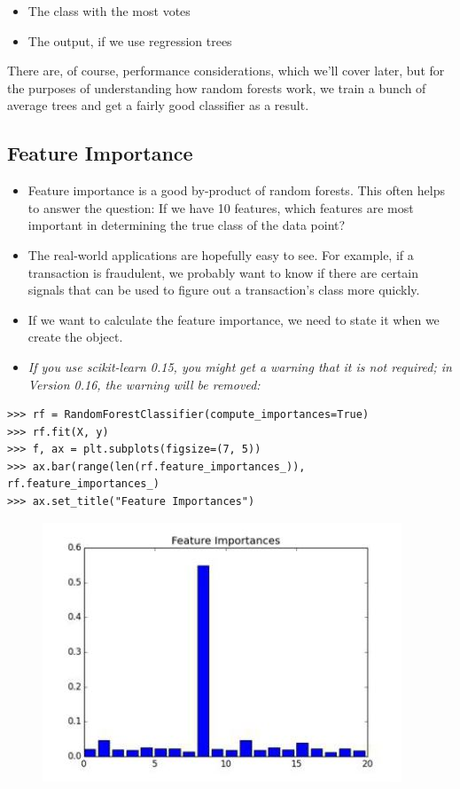 \documentclass[SKL-MASTER.tex]{subfiles}
\begin{document}
\begin{itemize}
\item  The class with the most votes
\item  The output, if we use regression trees
\end{itemize}
There are, of course, performance considerations, which we'll cover later, but for
the purposes of understanding how random forests work, we train a bunch of average trees
and get a fairly good classifier as a result.
\newpage
\subsection*{Feature Importance}
\begin{itemize}
\item Feature importance is a good by-product of random forests. This often helps to answer the
question: If we have 10 features, which features are most important in determining the true
class of the data point? 
\item The real-world applications are hopefully easy to see.  For example,
if a transaction is fraudulent, we probably want to know if there are certain signals that can
be used to figure out a transaction's class more quickly.
\item If we want to calculate the feature importance, we need to state it when we create the object.
\item \textit{If you use scikit-learn 0.15, you might get a warning that it is not required; in Version 0.16,
the warning will be removed:}
\end{itemize}

\begin{framed}
	\begin{verbatim}
>>> rf = RandomForestClassifier(compute_importances=True)
>>> rf.fit(X, y)
>>> f, ax = plt.subplots(figsize=(7, 5))
>>> ax.bar(range(len(rf.feature_importances_)),
rf.feature_importances_)
>>> ax.set_title("Feature Importances")
\end{verbatim}
\end{framed}
\begin{figure}
\centering
\includegraphics[width=0.7\linewidth]{images/SKL42-RF2}
\caption{}
\label{fig:SKL42-RF2}
\end{figure}
\end{document}
